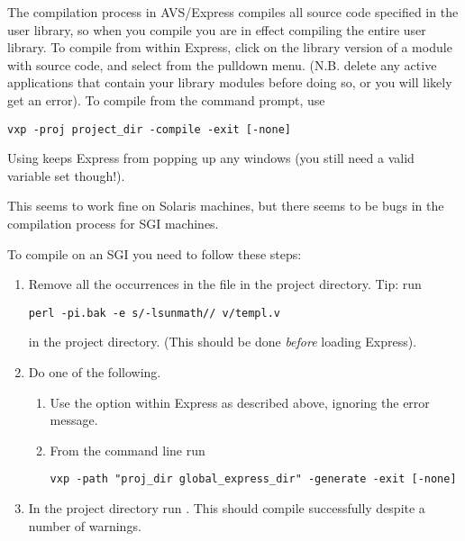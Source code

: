 The compilation process in AVS/Express compiles all source code specified
in the user library, so when you compile you are in effect compiling the
entire user library.
To compile from within Express, click on the library version of a module with
source code, and select  from the  pulldown
menu.  (N.B. delete any active applications that contain your library modules
before doing so, or you will likely get an error).
To compile from the command prompt, use
\begin{display}\begin{verbatim}vxp -proj project_dir -compile -exit [-none]\end{verbatim}\end{display}
Using  keeps Express from popping up any windows (you still need a
valid  variable set though!).

This seems to work fine on
Solaris machines, but there seems to be bugs in the compilation process for
SGI machines.

To compile on an SGI you need to follow these steps:
\begin{enumerate}

\item Remove all the  occurrences in the 
file in the project directory.  Tip: run
\begin{display}\begin{verbatim}perl -pi.bak -e s/-lsunmath// v/templ.v\end{verbatim}\end{display}
in the project directory.  (This should be done {\em before}
loading Express).

\item Do one of the following.
    
    \begin{enumerate}
    \item Use the  option within Express as described above,
	  ignoring the error message.
    \item From the command line run
\begin{display}\begin{verbatim}vxp -path "proj_dir global_express_dir" -generate -exit [-none]\end{verbatim}\end{display}
    \end{enumerate}

\item In the project directory run .  This should
compile successfully despite a number of warnings.

\end{enumerate}

